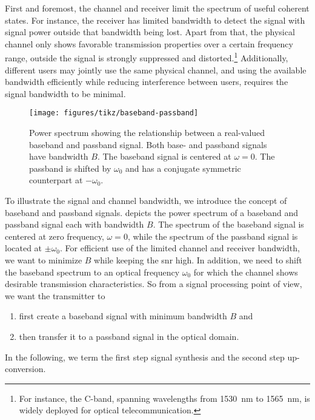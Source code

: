 First and foremost, the channel and receiver limit the spectrum of useful coherent states.
For instance, the receiver has limited bandwidth to detect the signal with signal power outside that bandwidth being lost.
Apart from that, the physical channel only shows favorable transmission properties over a certain frequency range, outside the signal is strongly suppressed and distorted.\footnote{For instance, the C-band, spanning wavelengths from \SI{1530}{\nano\meter} to \SI{1565}{\nano\meter}, is widely deployed for optical telecommunication.}
Additionally, different users may jointly use the same physical channel, and using the available bandwidth efficiently while reducing interference between users, requires the signal bandwidth to be minimal.
\begin{figure}[htb]
	\centering
	\texttt{[image: figures/tikz/baseband-passband]}
	\caption{Power spectrum showing the relationship between a real-valued baseband and passband signal. Both base- and passband signals have bandwidth $B$. The baseband signal is centered at $\omega=0$. The passband is shifted by $\omega_0$ and has a conjugate symmetric counterpart at $-\omega_0$.}\label{fig:baseband_passband}
\end{figure}
To illustrate the signal and channel bandwidth, we introduce the concept of baseband and passband signals\cite[p.~26]{Madhow2008}.
 depicts the power spectrum of a baseband and passband signal each with bandwidth $B$.
The spectrum of the baseband signal is centered at zero frequency, $\omega=0$, while the spectrum of the passband signal is located at $\pm\omega_0$.
For efficient use of the limited channel and receiver bandwidth, we want to minimize $B$ while keeping the \gls{snr} high.
In addition, we need to shift the baseband spectrum to an optical frequency $\omega_0$ for which the channel shows desirable transmission characteristics.
So from a signal processing point of view, we want the transmitter to
\begin{enumerate}
	\item first create a baseband signal with minimum bandwidth $B$ and
	\item then transfer it to a passband signal in the optical domain.
\end{enumerate}
In the following, we term the first step signal synthesis and the second step up-conversion.

